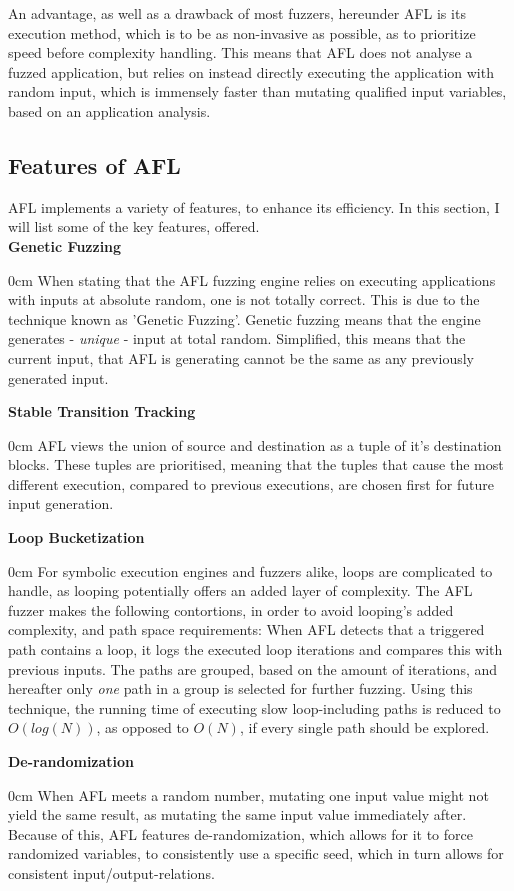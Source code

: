 \documentclass[a4paper]{article}
\newcommand{\tbf}[1]{\textbf{#1}}
\newcommand{\tit}[1]{\textit{#1}}
\newcommand{\marginwidth}{0.5cm}
\newcommand{\subsubsubsection}[1]{\tbf{#1}\begin{addmargin}[\marginwidth]{0cm}}
\begin{document}
An advantage, as well as a drawback of most fuzzers, hereunder AFL is its execution method, which is to be as non-invasive as possible, as to prioritize speed before complexity handling. This means that AFL does not analyse a fuzzed application, but relies on instead directly executing the application with random input, which is immensely faster than mutating qualified input variables, based on an application analysis.
\subsection{Features of AFL}
\label{sec:FeaturesAFL}
AFL implements a variety of features, to enhance its efficiency. In this section, I will list some of the key features, offered.\\
\subsubsubsection{Genetic Fuzzing}
When stating that the AFL fuzzing engine relies on executing applications with inputs at absolute random, one is not totally correct. This is due to the technique known as 'Genetic Fuzzing'. Genetic fuzzing means that the engine generates - \tit{unique} - input at total random. Simplified, this means that the current input, that AFL is generating cannot be the same as any previously generated input.
\end{addmargin}
\subsubsubsection{Stable Transition Tracking}
AFL views the union of source and destination as a tuple of it's destination blocks. These tuples are prioritised, meaning that the tuples that cause the most different execution, compared to previous executions, are chosen first for future input generation.
\end{addmargin}
\subsubsubsection{Loop Bucketization}
For symbolic execution engines and fuzzers alike, loops are complicated to handle, as looping potentially offers an added layer of complexity. The AFL fuzzer makes the following contortions, in order to avoid looping's added complexity, and path space requirements:
When AFL detects that a triggered path contains a loop, it logs the executed loop iterations and compares this with previous inputs. The paths are grouped, based on the amount of iterations, and hereafter only \tit{one} path in a group is selected for further fuzzing. Using this technique, the running time of executing slow loop-including paths is reduced to $O(log(N))$, as opposed to $O(N)$, if every single path should be explored.
\end{addmargin}
\subsubsubsection{De-randomization}
When AFL meets a random number, mutating one input value might not yield the same result, as mutating the same input value immediately after. Because of this, AFL features de-randomization, which allows for it to force randomized variables, to consistently use a specific seed, which in turn allows for consistent input/output-relations.
\end{addmargin}
\end{document}
